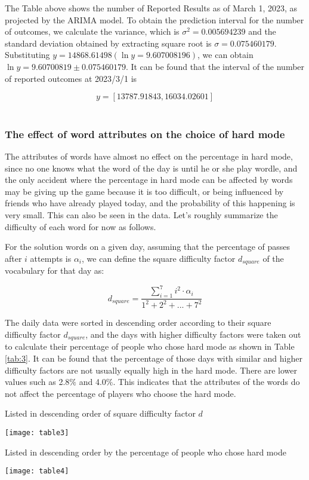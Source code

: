 \documentclass[12pt]{mcmthesis}
\begin{document}
The Table above shows the number of Reported Results as of March 1, 2023, as projected by the ARIMA model. To obtain the prediction interval for the number of outcomes, we calculate the variance, which is $ \sigma^{2}=0.005694239 $ and the standard deviation obtained by extracting square root is $ \sigma=0.075460179 $. Substituting $ y = 14868.61498 (\ln y = 9.607008196) $, we can obtain $ \ln y = 9.60700819 \pm  0.075460179 $. It can be found that the interval of the number of reported outcomes at 2023/3/1 is

\begin{equation}\label{eq:2}
	y = [ 13787.91843,16034.02601 ]
\end{equation}
\\[0.01pt]
\subsubsection{The effect of word attributes on the choice of hard mode}
\hspace{1.4em}The attributes of words have almost no effect on the percentage in hard mode, since no one knows what the word of the day is until he or she play wordle, and the only accident where the percentage in hard mode can be affected by words may be giving up the game because it is too difficult, or being influenced by friends who have already played today, and the probability of this happening is very small. This can also be seen in the data. Let's roughly summarize the difficulty of each word for now as follows.

For the solution words on a given day, assuming that the percentage of passes after $ i $ attempts is $ \alpha_{i} $, we can define the square difficulty factor $ d_{square} $ of the vocabulary for that day as:

\begin{equation}\label{eq:3}
d_{square}=\dfrac{\sum_{i=1}^7{i^{2}\cdot \alpha _{i}}}{1^{2}+2^{2}+...+7^{2}}
\end{equation}

The daily data were sorted in descending order according to their square difficulty factor $ d_{square} $, and the days with higher difficulty factors were taken out to calculate their percentage of people who chose hard mode as shown in Table \ref{tab:3}. It can be found that the percentage of those days with similar and higher difficulty factors are not usually equally high in the hard mode. There are lower values such as 2.8$ \% $ and 4.0$ \% $. This indicates that the attributes of the words do not affect the percentage of players who choose the hard mode.
\begin{table}[!htbp]
	\small
	\centering
	\caption{Listed in descending order of square difficulty factor $ d $}
	\texttt{[image: table3]}
	\label{tab:3}
\end{table}
\begin{table}[!htbp]
	\small
	\centering
	\caption{Listed in descending order by the percentage of people who chose hard mode}
	\texttt{[image: table4]}
	\label{tab:4}
\end{table}
\end{document}
